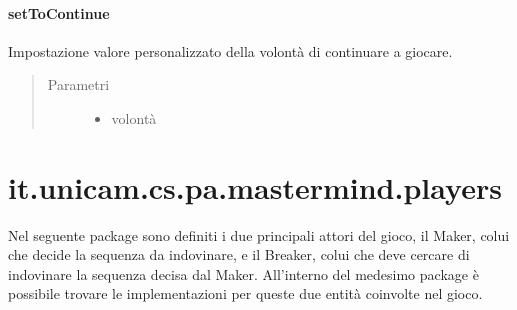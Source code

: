 \documentclass[letterpaper,10pt,italian,openany,oneside]{sphinxmanual}
\begin{document}
\paragraph{setToContinue}
\label{\detokenize{source/it/unicam/cs/pa/mastermind/gamecore/StartupSettings:settocontinue}}

\begin{fulllineitems}
\label{\detokenize{source/it/unicam/cs/pa/mastermind/gamecore/StartupSettings:it.unicam.cs.pa.mastermind.gamecore.StartupSettings.setToContinue(boolean)}}
Impostazione valore personalizzato della volontà di continuare a giocare.
\begin{quote}\begin{description}
\item[{Parametri}] \leavevmode\begin{itemize}
\item {} 
 \textendash{} volontà

\end{itemize}

\end{description}\end{quote}

\end{fulllineitems}



\section{it.unicam.cs.pa.mastermind.players}
\label{\detokenize{source/it/unicam/cs/pa/mastermind/players/package-index:it-unicam-cs-pa-mastermind-players}}\label{\detokenize{source/it/unicam/cs/pa/mastermind/players/package-index::doc}}
Nel seguente package sono definiti i due principali attori del gioco, il Maker, colui che decide la sequenza da indovinare, e il Breaker, colui che deve cercare di indovinare la sequenza decisa dal Maker. All’interno del medesimo package è possibile trovare le implementazioni per queste due entità coinvolte nel gioco.

\label{\detokenize{source/it/unicam/cs/pa/mastermind/players/package-index:package-it.unicam.cs.pa.mastermind.players}}
\end{document}
